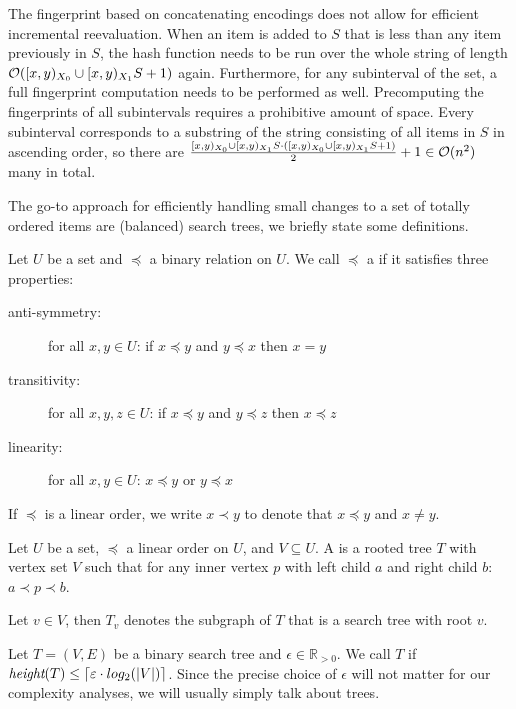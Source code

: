 The fingerprint based on concatenating encodings does not allow for efficient incremental reevaluation. When an item is added to $S$ that is less than any item previously in $S$, the hash function needs to be run over the whole string of length $\complexity{\abs{S} + 1}$ again. Furthermore, for any subinterval of the set, a full fingerprint computation needs to be performed as well. Precomputing the fingerprints of all subintervals requires a prohibitive amount of space. Every subinterval corresponds to a substring of the string consisting of all items in $S$ in ascending order, so there are $\frac{\abs{S} \cdot (\abs{S} + 1)}{2} + 1 \in \complexity{n^2}$ many in total.

The go-to approach for efficiently handling small changes to a set of totally ordered items are (balanced) search trees, we briefly state some definitions.

\begin{definition}
Let $U$ be a set and $\preceq$ a binary relation on $U$.
We call $\preceq$ a  if it satisfies three properties:

  \begin{description}
    \item[anti-symmetry:] for all $x, y \in U$: if $x \preceq y$ and $y \preceq x$ then $x = y$
    \item[transitivity:] for all $x, y, z \in U$: if $x \preceq y$ and $y \preceq z$ then $x \preceq z$
    \item[linearity:] for all $x, y \in U$: $x \preceq y$ or $y \preceq x$
  \end{description}

If $\preceq$ is a linear order, we write $x \prec y$ to denote that $x \preceq y$ and $x \neq y$.
\end{definition}

\begin{definition}
Let $U$ be a set, $\preceq$ a linear order on $U$, and $V \subseteq U$.
A  is a rooted tree $T$ with vertex set $V$ such that for any inner vertex $p$ with left child $a$ and right child $b$: $a \prec p \prec b$.

Let $v \in V$, then $T_v$ denotes the subgraph of $T$ that is a search tree with root $v$.
\end{definition}

\begin{definition}
Let $T = (V, E)$ be a binary search tree and $\epsilon \in \mathbb{R}_{> 0}$.
We call $T$  if $\textit{height}(T) \leq \ceil*{\epsilon \cdot log_2(|V|)}$.
Since the precise choice of $\epsilon$ will not matter for our complexity analyses, we will usually simply talk about  trees.
\end{definition}

